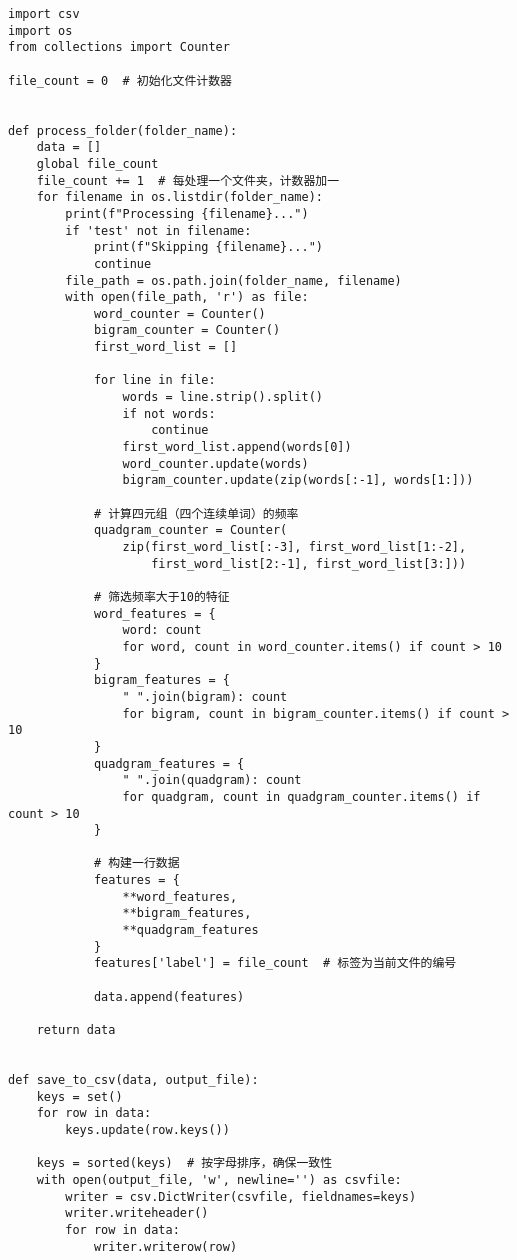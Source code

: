 \begin{lstlisting}
import csv
import os
from collections import Counter

file_count = 0  # 初始化文件计数器


def process_folder(folder_name):
    data = []
    global file_count
    file_count += 1  # 每处理一个文件夹，计数器加一
    for filename in os.listdir(folder_name):
        print(f"Processing {filename}...")
        if 'test' not in filename:
            print(f"Skipping {filename}...")
            continue
        file_path = os.path.join(folder_name, filename)
        with open(file_path, 'r') as file:
            word_counter = Counter()
            bigram_counter = Counter()
            first_word_list = []

            for line in file:
                words = line.strip().split()
                if not words:
                    continue
                first_word_list.append(words[0])
                word_counter.update(words)
                bigram_counter.update(zip(words[:-1], words[1:]))

            # 计算四元组（四个连续单词）的频率
            quadgram_counter = Counter(
                zip(first_word_list[:-3], first_word_list[1:-2],
                    first_word_list[2:-1], first_word_list[3:]))

            # 筛选频率大于10的特征
            word_features = {
                word: count
                for word, count in word_counter.items() if count > 10
            }
            bigram_features = {
                " ".join(bigram): count
                for bigram, count in bigram_counter.items() if count > 10
            }
            quadgram_features = {
                " ".join(quadgram): count
                for quadgram, count in quadgram_counter.items() if count > 10
            }

            # 构建一行数据
            features = {
                **word_features,
                **bigram_features,
                **quadgram_features
            }
            features['label'] = file_count  # 标签为当前文件的编号

            data.append(features)

    return data


def save_to_csv(data, output_file):
    keys = set()
    for row in data:
        keys.update(row.keys())

    keys = sorted(keys)  # 按字母排序，确保一致性
    with open(output_file, 'w', newline='') as csvfile:
        writer = csv.DictWriter(csvfile, fieldnames=keys)
        writer.writeheader()
        for row in data:
            writer.writerow(row)



\end{lstlisting}
